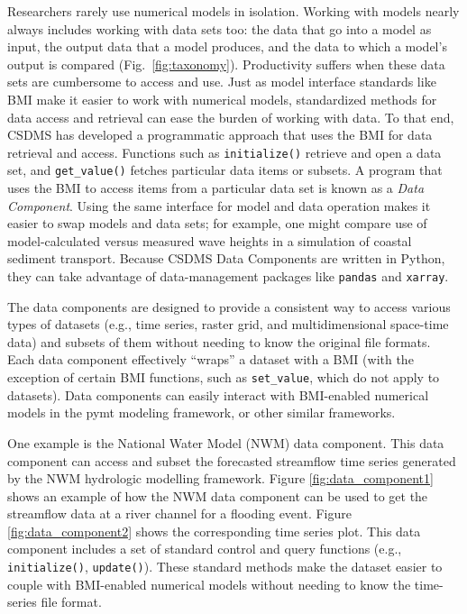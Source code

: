 \documentclass[journal abbreviation, manuscript]{copernicus}
\begin{document}
Researchers rarely use numerical models in isolation. Working with models nearly always includes working with data sets too: the data that go into a model as input, the output data that a model produces, and the data to which a model's output is compared (Fig.~\ref{fig:taxonomy}). Productivity suffers when these data sets are cumbersome to access and use. Just as model interface standards like BMI make it easier to work with numerical models, standardized methods for data access and retrieval can ease the burden of working with data. To that end, CSDMS has developed a programmatic approach that uses the BMI for data retrieval and access. Functions such as \texttt{initialize()} retrieve and open a data set, and \texttt{get\_value()} fetches particular data items or subsets. A program that uses the BMI to access items from a particular data set is known as a \textit{Data Component}. Using the same interface for model and data operation makes it easier to swap models and data sets; for example, one might compare use of model-calculated versus measured wave heights in a simulation of coastal sediment transport. Because CSDMS Data Components are written in Python, they can take advantage of data-management packages like \texttt{pandas} and \texttt{xarray}.

The data components are designed to provide a consistent way to access various types of datasets (e.g., time series, raster grid, and multidimensional space-time data) and subsets of them without needing to know the original file formats. Each data component effectively ``wraps'' a dataset with a BMI (with the exception of certain BMI functions, such as \texttt{set\_value}, which do not apply to datasets). Data components can easily interact with BMI-enabled numerical models in the pymt modeling framework, or other similar frameworks.

One example is the National Water Model (NWM) data component. This data component can access and subset the forecasted streamflow time series generated by the NWM hydrologic modelling framework. Figure \ref{fig:data_component1} shows an example of how the NWM data component can be used to get the streamflow data at a river channel for a flooding event. Figure \ref{fig:data_component2} shows the corresponding time series plot. This data component includes a set of standard control and query functions (e.g.,  \texttt{initialize()}, \texttt{update()}). These standard methods make the dataset easier to couple with BMI-enabled numerical models  without needing to know the time-series file format.
\end{document}
